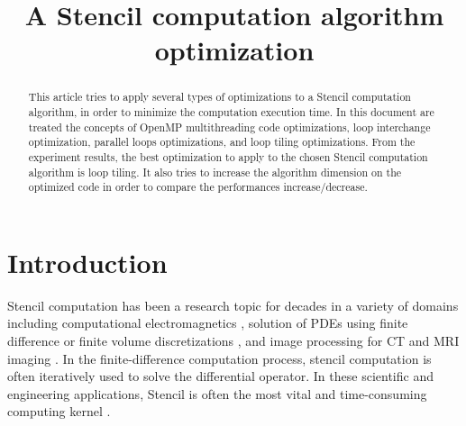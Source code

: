 \documentclass[conference]{IEEEtran}
\begin{document}
\title{A Stencil computation algorithm optimization}


\author{
}

\maketitle

\begin{abstract}
This article tries to apply several types of optimizations to a Stencil computation algorithm, in order to minimize the computation execution time. In this document are treated the concepts of OpenMP multithreading code optimizations, loop interchange optimization, parallel loops optimizations, and loop tiling optimizations. From the experiment results, the best optimization to apply to the chosen Stencil computation algorithm is loop tiling. It also tries to increase the algorithm dimension on the optimized code in order to compare the performances increase/decrease.
\end{abstract}

\section{Introduction}\label{sec:intro}

Stencil computation has been a research topic for decades in a variety of domains including computational electromagnetics \cite{taflove}, solution of PDEs using finite difference or finite volume discretizations \cite{smith}, and image processing for CT and MRI imaging \cite{cong-huang-zou}\cite{cong-zou}. In the finite-difference computation process, stencil computation is often iteratively used to solve the differential operator. In these scientific and engineering applications, Stencil is often the most vital and time-consuming computing kernel \cite{su-zhang-mei}.
\end{document}

